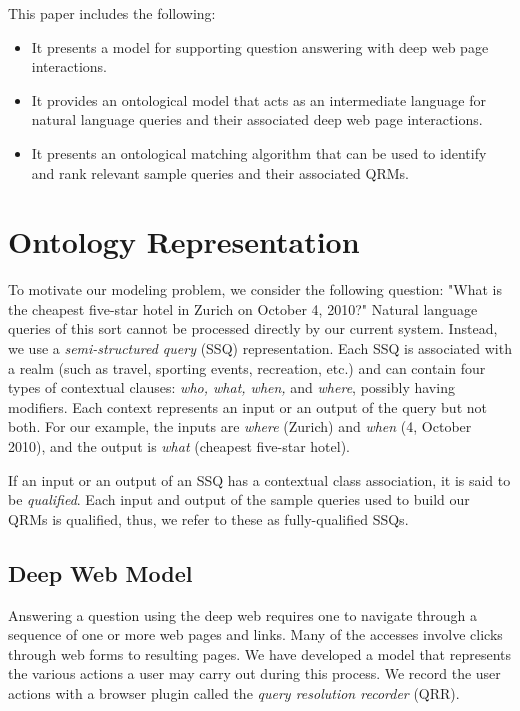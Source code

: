\documentclass{IOS-Book-Article}
\begin{document}
This paper includes the following:  
\begin{itemize}
\item It presents a model for supporting question answering with deep web page interactions.

\item It provides an ontological model that acts as an intermediate language for natural language queries and their associated deep web page interactions.

\item It presents an ontological matching algorithm that can be used to identify and rank relevant sample queries and their associated QRMs. 
\end{itemize}


\section{Ontology Representation}
To motivate our modeling problem, we consider the following question: "What is the cheapest five-star hotel in Zurich on October 4, 2010?" Natural language queries of this sort cannot be processed directly by our current system. Instead, we use a \emph{semi-structured query} (SSQ) representation. Each SSQ is associated with a realm (such as travel, sporting events, recreation, etc.) and can contain four types of contextual clauses: \emph{who, what, when,} and \emph{where}, possibly having modifiers.  Each context represents an input or an output of the query but not both. For our example, the inputs are \emph{where} (Zurich) and \emph{when} (4, October 2010), and the output is \emph{what} (cheapest five-star hotel).

If an input or an output of an SSQ has a contextual class association, it is said to be \emph{qualified}.  Each input and output of the sample queries used to build our QRMs is qualified, thus, we refer to these as fully-qualified SSQs.

\subsection{Deep Web Model}
Answering a question using the deep web requires one to navigate through a sequence of one or more web pages and links.  Many of the accesses involve clicks through web forms to resulting pages.  We have developed a model that represents the various actions a user may carry out during this process.  We record the user actions with a browser plugin called the \emph{query resolution recorder} (QRR).
\end{document}
